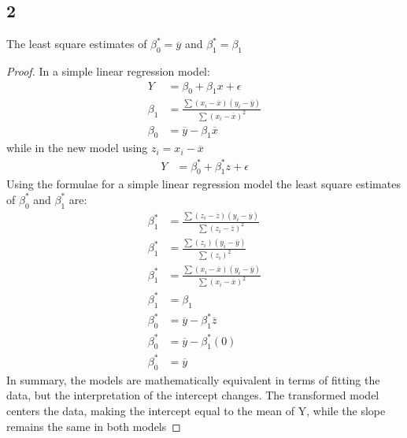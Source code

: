 \subsection{2}
\begin{claim}
    The least square estimates of \(\beta_0^* = \overline{y}\) and \(\beta_1^* = \beta_1\)
\end{claim}
\begin{proof}
    In a simple linear regression model:
    \begin{align*}
        Y &= \beta_0 + \beta_1x + \epsilon\\
        \beta_1 &= \frac{\sum(x_i - \overline{x})(y_i-\overline{y})}{\sum(x_i - \overline{x})^2}\\
        \beta_0 &= \overline{y} - \beta_1\overline{x}
    \end{align*}
    while in the new model using \(z_i = x_i - \overline{x}\)
    \begin{align*}
        Y &= \beta_0^* + \beta_1^*z + \epsilon
    \end{align*}
    Using the formulae for a simple linear regression model the least square estimates of \(\beta_0^*\) and \(\beta_1^*\) are:
    \begin{align*}
        \beta_1^* &= \frac{\sum(z_i-\overline{z})(y_i-\overline{y})}{\sum(z_i - \overline{z})^2}\\
        \beta_1^* &= \frac{\sum(z_i)(y_i-\overline{y})}{\sum(z_i)^2}\\
        \beta_1^* &= \frac{\sum(x_i - \overline{x})(y_i-\overline{y})}{\sum(x_i - \overline{x})^2}\\
        \beta_1^* &= \beta_1\\
        \beta_0^* &= \overline{y} - \beta_1^*\overline{z}\\
        \beta_0^* &= \overline{y} - \beta_1^*(0)\\
        \beta_0^* &= \overline{y}
    \end{align*}
    In summary, the models are mathematically equivalent in terms of fitting the data, but the interpretation of the intercept changes. The transformed model centers the data, making the intercept equal to the mean of Y, while the slope remains the same in both models
\end{proof}

